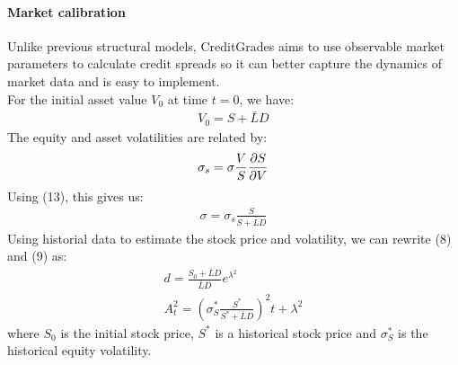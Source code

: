 \documentclass[11t,a4paper]{article}
\begin{document}
\paragraph {Market calibration}
Unlike previous structural models, CreditGrades aims to use observable market parameters to calculate credit spreads so it can better capture the dynamics of market data and is easy to implement.\\
For the initial asset value $V_0$ at time $t=0$, we have:
\begin{align}
    V_0 = S + \bar{L}D
\end{align}
The equity and asset volatilities are related by:
\begin{align}
    \sigma_s = \sigma \frac{V}{S}\pdv{S}{V}
\end{align}
Using (13), this gives us:
\begin{align}
    \sigma = \sigma_s \frac{S}{S + \bar{L}D}
\end{align}
Using historial data to estimate the stock price and volatility, we can rewrite (8) and (9) as:
\begin{gather}
d = \frac{S_0 + \bar{L}D}{\bar{L}D} e^{\lambda^2}\\
A^2_t = (\sigma_S^*\frac{S^*}{S^*+\bar{L}D})^2t + \lambda^2
\end{gather}
where $S_0$ is the initial stock price, $S^*$ is a historical stock price and $\sigma_S^*$ is the historical equity volatility. 
\end{document}
